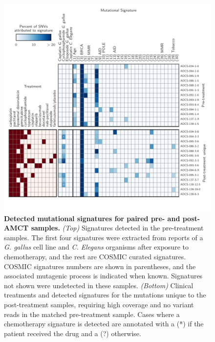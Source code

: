 \begin{figure}[htbp]
\centering
\includegraphics[scale=1.0]{figures/signatures.pdf}
\caption{\textbf{Detected mutational signatures for paired pre- and post-AMCT samples.} \textit{(Top)} Signatures detected in the pre-treatment samples. The first four signatures were extracted from reports of a \textit{G. gallus} cell line and \textit{C. Elegans} organisms after exposure to chemotherapy, and the rest are COSMIC curated signatures. COSMIC signatures numbers are shown in parentheses, and the associated mutagenic process is indicated when known. Signatures not shown were undetected in these samples. \textit{(Bottom)} Clinical treatments and detected signatures for the mutations unique to the post-treatment samples, requiring high coverage and no variant reads in the matched pre-treatment sample. Cases where a chemotherapy signature is detected are annotated with a (*) if the patient received the drug and a (?) otherwise.}
\label{fig:signatures}
\end{figure}

